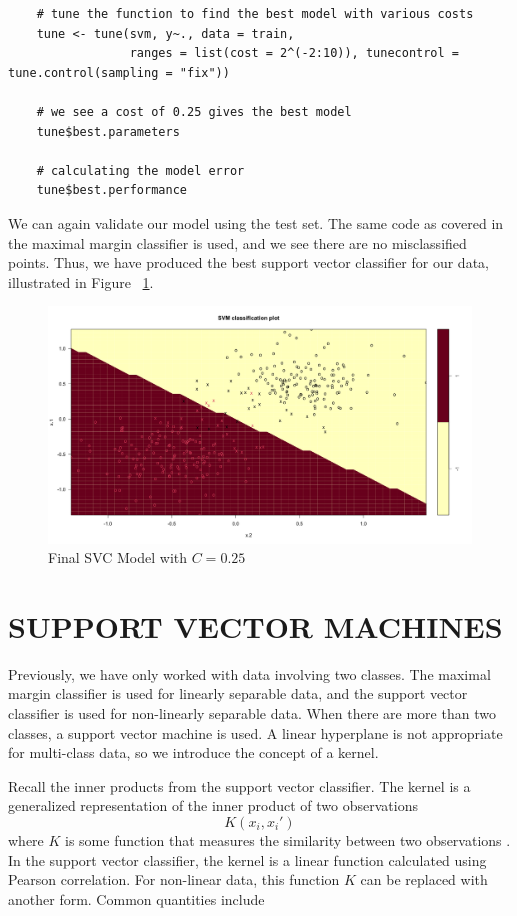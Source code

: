 \documentclass[12pt]{article}
\begin{document}
\begin{verbatim}
    # tune the function to find the best model with various costs
    tune <- tune(svm, y~., data = train, 
                 ranges = list(cost = 2^(-2:10)), tunecontrol = tune.control(sampling = "fix"))
    
    # we see a cost of 0.25 gives the best model
    tune$best.parameters
    
    # calculating the model error
    tune$best.performance
\end{verbatim}

We can again validate our model using the test set. The same code as covered in the maximal margin classifier is used, and we see there are no misclassified points. Thus, we have produced the best support vector classifier for our data, illustrated in Figure ~\ref{fig_svc_final_model}.

\begin{figure}[ht]
    \centering
    \includegraphics[width=5in]{Figures/svc/svc_final_model.png}
    \caption{Final SVC Model with \(C = 0.25\)}
    \label{fig_svc_final_model}
\end{figure}

\section{SUPPORT VECTOR MACHINES}

Previously, we have only worked with data involving two classes. The maximal margin classifier is used for linearly separable data, and the support vector classifier is used for non-linearly separable data. When there are more than two classes, a support vector machine is used. A linear hyperplane is not appropriate for multi-class data, so we introduce the concept of a kernel.

Recall the inner products from the support vector classifier. The kernel is a generalized representation of the inner product of two observations \[K(x_i,x_i')\] where \(K\) is some function that measures the similarity between two observations \citep{introstatlearning}. In the support vector classifier, the kernel is a linear function calculated using Pearson correlation. For non-linear data, this function \(K\) can be replaced with another form. Common quantities include
\end{document}
